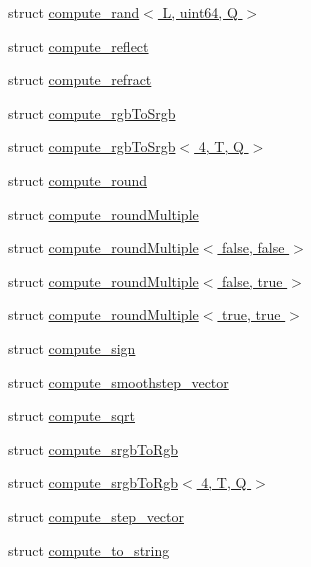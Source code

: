 \begin{DoxyCompactItemize}
\item 
struct \hyperlink{structglm_1_1detail_1_1compute__rand_3_01_l_00_01uint64_00_01_q_01_4}{compute\+\_\+rand$<$ L, uint64, Q $>$}
\item 
struct \hyperlink{structglm_1_1detail_1_1compute__reflect}{compute\+\_\+reflect}
\item 
struct \hyperlink{structglm_1_1detail_1_1compute__refract}{compute\+\_\+refract}
\item 
struct \hyperlink{structglm_1_1detail_1_1compute__rgb_to_srgb}{compute\+\_\+rgb\+To\+Srgb}
\item 
struct \hyperlink{structglm_1_1detail_1_1compute__rgb_to_srgb_3_014_00_01_t_00_01_q_01_4}{compute\+\_\+rgb\+To\+Srgb$<$ 4, T, Q $>$}
\item 
struct \hyperlink{structglm_1_1detail_1_1compute__round}{compute\+\_\+round}
\item 
struct \hyperlink{structglm_1_1detail_1_1compute__round_multiple}{compute\+\_\+round\+Multiple}
\item 
struct \hyperlink{structglm_1_1detail_1_1compute__round_multiple_3_01false_00_01false_01_4}{compute\+\_\+round\+Multiple$<$ false, false $>$}
\item 
struct \hyperlink{structglm_1_1detail_1_1compute__round_multiple_3_01false_00_01true_01_4}{compute\+\_\+round\+Multiple$<$ false, true $>$}
\item 
struct \hyperlink{structglm_1_1detail_1_1compute__round_multiple_3_01true_00_01true_01_4}{compute\+\_\+round\+Multiple$<$ true, true $>$}
\item 
struct \hyperlink{structglm_1_1detail_1_1compute__sign}{compute\+\_\+sign}
\item 
struct \hyperlink{structglm_1_1detail_1_1compute__smoothstep__vector}{compute\+\_\+smoothstep\+\_\+vector}
\item 
struct \hyperlink{structglm_1_1detail_1_1compute__sqrt}{compute\+\_\+sqrt}
\item 
struct \hyperlink{structglm_1_1detail_1_1compute__srgb_to_rgb}{compute\+\_\+srgb\+To\+Rgb}
\item 
struct \hyperlink{structglm_1_1detail_1_1compute__srgb_to_rgb_3_014_00_01_t_00_01_q_01_4}{compute\+\_\+srgb\+To\+Rgb$<$ 4, T, Q $>$}
\item 
struct \hyperlink{structglm_1_1detail_1_1compute__step__vector}{compute\+\_\+step\+\_\+vector}
\item 
struct \hyperlink{structglm_1_1detail_1_1compute__to__string}{compute\+\_\+to\+\_\+string}
\item 

\end{DoxyCompactItemize}
